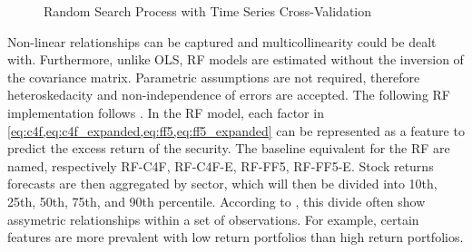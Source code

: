 \begin{figure}[H]
    \caption{Random Search Process with Time Series Cross-Validation}
    \end{figure}

    

Non-linear relationships can be captured and multicollinearity could be dealt with. Furthermore, unlike OLS, RF models are estimated without the inversion of the covariance matrix. Parametric assumptions are not required, therefore heteroskedacity and non-independence of errors are accepted. The following RF implementation follows . In the RF model, each factor in \cref{eq:c4f,eq:c4f_expanded,eq:ff5,eq:ff5_expanded} can be represented as a feature to predict the excess return of the security. The baseline equivalent for the RF are named, respectively RF-C4F, RF-C4F-E, RF-FF5, RF-FF5-E. Stock returns forecasts are then aggregated by sector, which will then be divided into 10th, 25th, 50th, 75th, and 90th percentile. According to , this divide often show assymetric relationships within a set of observations. For example, certain features are more prevalent with low return portfolios than high return portfolios.


